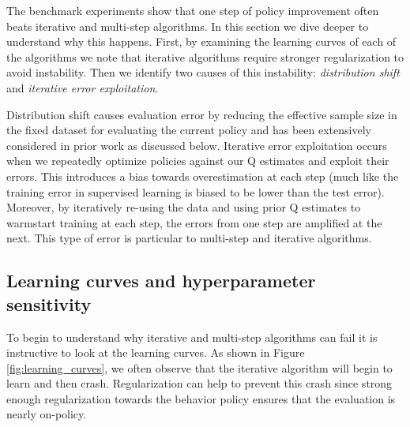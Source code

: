 
The benchmark experiments show that one step of policy improvement often beats iterative and multi-step algorithms. In this section we dive deeper to understand why this happens. First, by examining the learning curves of each of the algorithms we note that iterative algorithms require stronger regularization to avoid instability. Then we identify two causes of this instability: \emph{distribution shift} and \emph{iterative error exploitation}.

Distribution shift causes evaluation error by reducing the effective sample size in the fixed dataset for evaluating the current policy and has been extensively considered in prior work as discussed below. Iterative error exploitation occurs when we repeatedly optimize policies against our Q estimates and exploit their errors. This introduces a bias towards overestimation at each step (much like the training error in supervised learning is biased to be lower than the test error). Moreover, by iteratively re-using the data and using prior Q estimates to warmstart training at each step, the errors from one step are amplified at the next. This type of error is particular to multi-step and iterative algorithms.

\subsection{Learning curves and hyperparameter sensitivity}

To begin to understand why iterative and multi-step algorithms can fail it is instructive to look at the learning curves. As shown in Figure \ref{fig:learning_curves}, we often observe that the iterative algorithm will begin to learn and then crash. Regularization can help to prevent this crash since strong enough regularization towards the behavior policy ensures that the evaluation is nearly on-policy.


